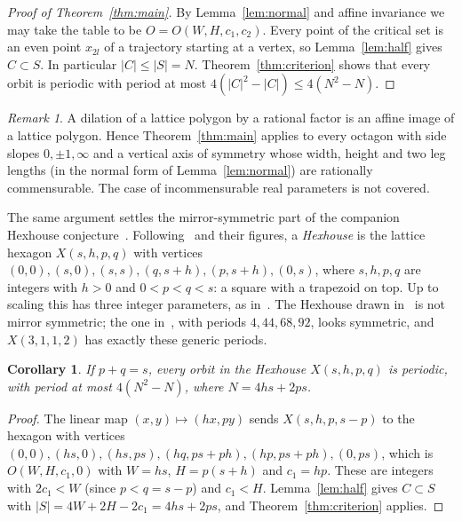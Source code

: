 \documentclass[11pt]{amsart}
\newtheorem{corollary}[theorem]{Corollary}
\theoremstyle{definition}
\theoremstyle{remark}
\newtheorem{remark}[theorem]{Remark}
\begin{document}
\begin{proof}[Proof of Theorem~\ref{thm:main}]
By Lemma~\ref{lem:normal} and affine invariance we may take the table to be $O=O(W,H,c_1,c_2)$. Every point of the critical set is an even point $x_{2l}$ of a trajectory starting at a vertex, so Lemma~\ref{lem:half} gives $C\subset S$. In particular $|C|\le|S|=N$. Theorem~\ref{thm:criterion} shows that every orbit is periodic with period at most $4(|C|^2-|C|)\le4(N^2-N)$.
\end{proof}

\begin{remark}\label{rem:rational}
A dilation of a lattice polygon by a rational factor is an affine image of a lattice polygon. Hence Theorem~\ref{thm:main} applies to every octagon with side slopes $0,\pm1,\infty$ and a vertical axis of symmetry whose width, height and two leg lengths (in the normal form of Lemma~\ref{lem:normal}) are rationally commensurable. The case of incommensurable real parameters is not covered.
\end{remark}

The same argument settles the mirror-symmetric part of the companion Hexhouse conjecture~\cite[Conjecture~6.1]{ABS25}. Following~\cite[Section~6]{ABS25} and their figures, a \emph{Hexhouse} is the lattice hexagon $X(s,h,p,q)$ with vertices $(0,0),(s,0),(s,s),(q,s+h),(p,s+h),(0,s)$, where $s,h,p,q$ are integers with $h>0$ and $0<p<q<s$: a square with a trapezoid on top. Up to scaling this has three integer parameters, as in~\cite{ABS25}. The Hexhouse drawn in~\cite[Figure~15]{ABS25} is not mirror symmetric; the one in~\cite[Figure~18]{ABS25}, with periods $4,44,68,92$, looks symmetric, and $X(3,1,1,2)$ has exactly these generic periods.

\begin{corollary}\label{cor:hex}
If $p+q=s$, every orbit in the Hexhouse $X(s,h,p,q)$ is periodic, with period at most $4(N^2-N)$, where $N=4hs+2ps$.
\end{corollary}

\begin{proof}
The linear map $(x,y)\mapsto(hx,py)$ sends $X(s,h,p,s-p)$ to the hexagon with vertices $(0,0),(hs,0),(hs,ps),(hq,ps+ph),(hp,ps+ph),(0,ps)$, which is $O(W,H,c_1,0)$ with $W=hs$, $H=p(s+h)$ and $c_1=hp$. These are integers with $2c_1<W$ (since $p<q=s-p$) and $c_1<H$. Lemma~\ref{lem:half} gives $C\subset S$ with $|S|=4W+2H-2c_1=4hs+2ps$, and Theorem~\ref{thm:criterion} applies.
\end{proof}
\end{document}
